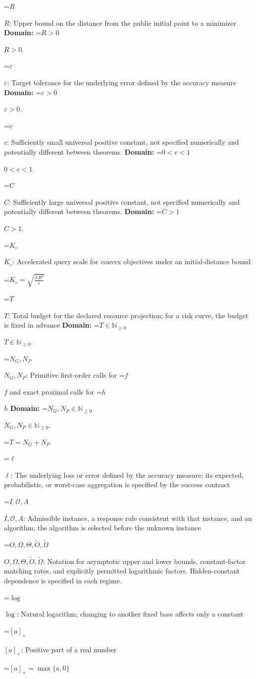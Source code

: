 \documentclass[10pt,a4paper]{article}
\newcommand{\AtlasMath}[1]{\par\begingroup\centering\setbox0=\hbox{$\displaystyle #1$}\ifdim\wd0>1.4\linewidth\typeout{ATLAS WIDE FORMULA: \the\wd0}\fi\ifdim\wd0>\linewidth\resizebox{\linewidth}{!}{\box0}\else\box0\fi\par\endgroup}
\newcommand{\AtlasInlineMath}[1]{\begingroup\setbox0=\hbox{$#1$}\ifdim\wd0>.4\linewidth\endgroup\AtlasMath{#1}\else\endgroup$#1$\fi}
\begin{document}
\AtlasInlineMath{R}: Upper bound on the distance from the public initial point to a minimizer \textbf{Domain:} \AtlasInlineMath{R>0}.

\AtlasInlineMath{\varepsilon}: Target tolerance for the underlying error defined by the accuracy measure \textbf{Domain:} \AtlasInlineMath{\varepsilon>0}.

\AtlasInlineMath{c}: Sufficiently small universal positive constant, not specified numerically and potentially different between theorems. \textbf{Domain:} \AtlasInlineMath{0<c<1}.

\AtlasInlineMath{C}: Sufficiently large universal positive constant, not specified numerically and potentially different between theorems. \textbf{Domain:} \AtlasInlineMath{C>1}.

\AtlasInlineMath{K_\varepsilon}: Accelerated query scale for convex objectives under an initial-distance bound


\AtlasMath{K_\varepsilon=\sqrt{\frac{\beta\,{R}^{2}}{\varepsilon}}}


\AtlasInlineMath{T}: Total budget for the declared resource projection; for a risk curve, the budget is fixed in advance \textbf{Domain:} \AtlasInlineMath{T\in\mathbb{N}_{\ge0}}.

\AtlasInlineMath{N_G,N_P}: Primitive first-order calls for \AtlasInlineMath{f} and exact proximal calls for \AtlasInlineMath{h} \textbf{Domain:} \AtlasInlineMath{N_G,N_P\in\mathbb{N}_{\ge0}}.


\AtlasMath{T=N_G+N_P}


\AtlasInlineMath{\ell}: The underlying loss or error defined by the accuracy measure; its expected, probabilistic, or worst-case aggregation is specified by the success contract

\AtlasInlineMath{I,\mathcal{O},A}: Admissible instance, a response rule consistent with that instance, and an algorithm; the algorithm is selected before the unknown instance

\AtlasInlineMath{O,\Omega,\Theta,\widetilde{O},\widetilde\Omega}: Notation for asymptotic upper and lower bounds, constant-factor matching rates, and explicitly permitted logarithmic factors. Hidden-constant dependence is specified in each regime.

\AtlasInlineMath{\log}: Natural logarithm; changing to another fixed base affects only a constant

\AtlasInlineMath{[a]_+}: Positive part of a real number


\AtlasMath{[a]_+=\max\{a,0\}}
\end{document}

